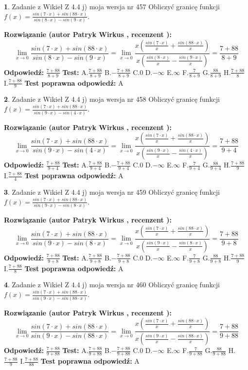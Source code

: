 \documentclass[12pt, a4paper]{article}
\theoremstyle{definition} %
\newtheorem{zad}{}
\newcommand{\zadStart}[1]{\begin{zad}#1\newline}
\newcommand{\zadStop}{\end{zad}}
\newcommand{\rozwStart}[2]{\noindent \textbf{Rozwiązanie (autor #1 , recenzent #2): }\newline}
\newcommand{\rozwStop}{\newline}
\newcommand{\odpStart}{\noindent \textbf{Odpowiedź:}\newline}
\newcommand{\odpStop}{\newline}
\newcommand{\testStart}{\noindent \textbf{Test:}\newline}
\newcommand{\testStop}{\newline}
\newcommand{\kluczStart}{\noindent \textbf{Test poprawna odpowiedź:}\newline}
\newcommand{\kluczStop}{\newline}
\begin{document}
\zadStart{Zadanie z Wikieł Z 4.4 j) moja wersja nr 457}
Obliczyć granicę funkcji $f(x)=\frac{sin(7\cdot x) +sin(88\cdot x)}{sin(8\cdot x) -sin(9\cdot x)}$.
\zadStop
\rozwStart{Patryk Wirkus}{}
$$\lim\limits_{x\to 0}\frac{sin(7\cdot x) +sin(88\cdot x)}{sin(8\cdot x) -sin(9\cdot x)}=\lim\limits_{x\to 0}\frac{x(\frac{sin(7\cdot x)}{x}+\frac{sin(88\cdot x)}{x})}{x(\frac{sin(8\cdot x)}{x}-\frac{sin(9\cdot x)}{x})}=\frac{7+88}{8+9}$$
\rozwStop
\odpStart
$\frac{7+88}{8+9}$
\odpStop
\testStart
A.$\frac{7+88}{8+9}$
B.$-\frac{7+88}{8+9}$
C.$0$
D.$-\infty$
E.$\infty$
F.$\frac{7}{8+9}$
G.$\frac{88}{8+9}$
H.$\frac{7+88}{8}$
I.$\frac{7+88}{9}$
\testStop
\kluczStart
A
\kluczStop



\zadStart{Zadanie z Wikieł Z 4.4 j) moja wersja nr 458}
Obliczyć granicę funkcji $f(x)=\frac{sin(7\cdot x) +sin(88\cdot x)}{sin(9\cdot x) -sin(4\cdot x)}$.
\zadStop
\rozwStart{Patryk Wirkus}{}
$$\lim\limits_{x\to 0}\frac{sin(7\cdot x) +sin(88\cdot x)}{sin(9\cdot x) -sin(4\cdot x)}=\lim\limits_{x\to 0}\frac{x(\frac{sin(7\cdot x)}{x}+\frac{sin(88\cdot x)}{x})}{x(\frac{sin(9\cdot x)}{x}-\frac{sin(4\cdot x)}{x})}=\frac{7+88}{9+4}$$
\rozwStop
\odpStart
$\frac{7+88}{9+4}$
\odpStop
\testStart
A.$\frac{7+88}{9+4}$
B.$-\frac{7+88}{9+4}$
C.$0$
D.$-\infty$
E.$\infty$
F.$\frac{7}{9+4}$
G.$\frac{88}{9+4}$
H.$\frac{7+88}{9}$
I.$\frac{7+88}{4}$
\testStop
\kluczStart
A
\kluczStop



\zadStart{Zadanie z Wikieł Z 4.4 j) moja wersja nr 459}
Obliczyć granicę funkcji $f(x)=\frac{sin(7\cdot x) +sin(88\cdot x)}{sin(9\cdot x) -sin(8\cdot x)}$.
\zadStop
\rozwStart{Patryk Wirkus}{}
$$\lim\limits_{x\to 0}\frac{sin(7\cdot x) +sin(88\cdot x)}{sin(9\cdot x) -sin(8\cdot x)}=\lim\limits_{x\to 0}\frac{x(\frac{sin(7\cdot x)}{x}+\frac{sin(88\cdot x)}{x})}{x(\frac{sin(9\cdot x)}{x}-\frac{sin(8\cdot x)}{x})}=\frac{7+88}{9+8}$$
\rozwStop
\odpStart
$\frac{7+88}{9+8}$
\odpStop
\testStart
A.$\frac{7+88}{9+8}$
B.$-\frac{7+88}{9+8}$
C.$0$
D.$-\infty$
E.$\infty$
F.$\frac{7}{9+8}$
G.$\frac{88}{9+8}$
H.$\frac{7+88}{9}$
I.$\frac{7+88}{8}$
\testStop
\kluczStart
A
\kluczStop



\zadStart{Zadanie z Wikieł Z 4.4 j) moja wersja nr 460}
Obliczyć granicę funkcji $f(x)=\frac{sin(7\cdot x) +sin(88\cdot x)}{sin(9\cdot x) -sin(88\cdot x)}$.
\zadStop
\rozwStart{Patryk Wirkus}{}
$$\lim\limits_{x\to 0}\frac{sin(7\cdot x) +sin(88\cdot x)}{sin(9\cdot x) -sin(88\cdot x)}=\lim\limits_{x\to 0}\frac{x(\frac{sin(7\cdot x)}{x}+\frac{sin(88\cdot x)}{x})}{x(\frac{sin(9\cdot x)}{x}-\frac{sin(88\cdot x)}{x})}=\frac{7+88}{9+88}$$
\rozwStop
\odpStart
$\frac{7+88}{9+88}$
\odpStop
\testStart
A.$\frac{7+88}{9+88}$
B.$-\frac{7+88}{9+88}$
C.$0$
D.$-\infty$
E.$\infty$
F.$\frac{7}{9+88}$
G.$\frac{88}{9+88}$
H.$\frac{7+88}{9}$
I.$\frac{7+88}{88}$
\testStop
\kluczStart
A
\kluczStop
\end{document}
